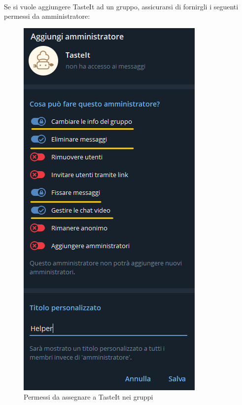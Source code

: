 \documentclass[a4paper, 12pt]{article}
\begin{document}
	\paragraph{}
	Se si vuole aggiungere TasteIt ad un gruppo, assicurarsi di fornirgli i seguenti permessi da amministratore:
	\newpage
	\begin{figure}[h!]
		\centering
		\includegraphics[scale=1.1]{adminPermissions.png}
		\caption{Permessi da assegnare a TasteIt nei gruppi}
	\end{figure}
	
	\newpage
\end{document}

